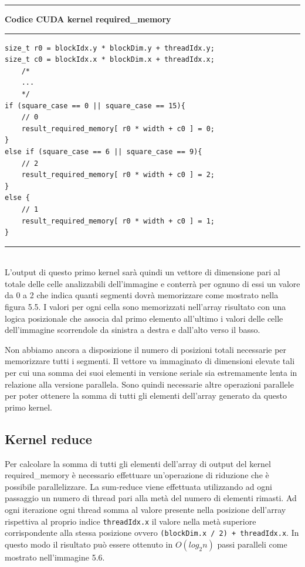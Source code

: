 \documentclass[12pt,a4paper]{report}
\begin{document}
\noindent\rule[0.5ex]{\linewidth}{2pt}
\small{\textbf{Codice CUDA kernel required\_memory}} \\
\noindent\rule[0.5ex]{\linewidth}{1pt}
\begin{lstlisting}
size_t r0 = blockIdx.y * blockDim.y + threadIdx.y;
size_t c0 = blockIdx.x * blockDim.x + threadIdx.x;
    /*
    ...
    */
if (square_case == 0 || square_case == 15){
    // 0
    result_required_memory[ r0 * width + c0 ] = 0;
}
else if (square_case == 6 || square_case == 9){
    // 2
    result_required_memory[ r0 * width + c0 ] = 2;
}
else {
    // 1
    result_required_memory[ r0 * width + c0 ] = 1;
}  
\end{lstlisting}
\noindent\rule[0.5ex]{\linewidth}{1pt} \\[10pt]
\newpage
L'output di questo primo kernel sarà quindi un vettore di dimensione pari al totale delle celle analizzabili dell'immagine e conterrà per ognuno di essi un valore da 0 a 2 che indica quanti segmenti dovrà memorizzare come mostrato nella figura 5.5. I valori per ogni cella sono memorizzati nell'array risultato con una logica posizionale che associa dal primo elemento all'ultimo i valori delle celle dell'immagine scorrendole da sinistra a destra e dall'alto verso il basso.
\begin{figure}[H]
\centering
\begin{floatrow}[1]
\end{floatrow}
\end{figure} 
Non abbiamo ancora a disposizione il numero di posizioni totali necessarie per memorizzare tutti i segmenti. Il vettore va immaginato di dimensioni elevate tali per cui una somma dei suoi elementi in versione seriale sia estremamente lenta in relazione alla versione parallela. Sono quindi necessarie altre operazioni parallele per poter ottenere la somma di tutti gli elementi dell'array generato da questo primo kernel. \newpage

\subsection{Kernel reduce}
Per calcolare la somma di tutti gli elementi dell'array di output del kernel required\_memory è necessario effettuare un'operazione di riduzione che è possibile parallelizzare. \newline
La sum-reduce viene effettuata utilizzando ad ogni passaggio un numero di thread pari alla metà del numero di elementi rimasti. Ad ogni iterazione ogni thread somma al valore presente nella posizione dell'array rispettiva al proprio indice \verb|threadIdx.x| il valore nella metà superiore corrispondente alla stessa posizione ovvero \verb|(blockDim.x / 2) + threadIdx.x|. \newline In questo modo il risultato può essere ottenuto in \(O(log_2 n)\) passi paralleli come mostrato nell'immagine 5.6.
\end{document}
